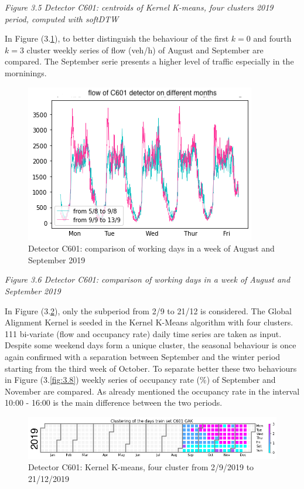 \documentclass[11pt]{article}
\begin{document}
\emph{\small Figure 3.5 Detector C601: centroids of Kernel K-means, four clusters 2019 period, computed with softDTW}

    In Figure (3.\ref{fig:3.6}), to better distinguish the behaviour of the
first \(k=0\) and fourth \(k=3\) cluster weekly series of flow (veh/h)
of August and September are compared. The September serie presents a
higher level of traffic especially in the morninings.

    \begin{figure}
    \centering
    \includegraphics[scale=0.5]{GAK august vs september 2019.png}
    \caption{Detector C601: comparison of working days in a week of August and September 2019}
    \label{fig:3.6}
\end{figure}

\emph{\small Figure 3.6 Detector C601: comparison of working days in a week of August and September 2019 }

    In Figure (3.\ref{fig:3.7}), only the subperiod from 2/9 to 21/12 is
considered. The Global Alignment Kernel is seeded in the Kernel K-Means
algorithm with four clusters. 111 bi-variate (flow and occupancy rate)
daily time series are taken as input. Despite some weekend days form a
unique cluster, the seasonal behaviour is once again confirmed with a
separation between September and the winter period starting from the
third week of October. To separate better these two behaviours in Figure
(3.\ref{fig:3.8}) weekly series of occupancy rate (\(\%\)) of September
and November are compared. As already mentioned the occupancy rate in
the interval 10:00 - 16:00 is the main difference between the two
periods.

    \begin{figure}
    \centering
    \includegraphics{GAK K=4 winter 2019.png}
    \caption{Detector C601: Kernel K-means, four cluster from 2/9/2019 to 21/12/2019}
    \label{fig:3.7}
\end{figure}
\end{document}
